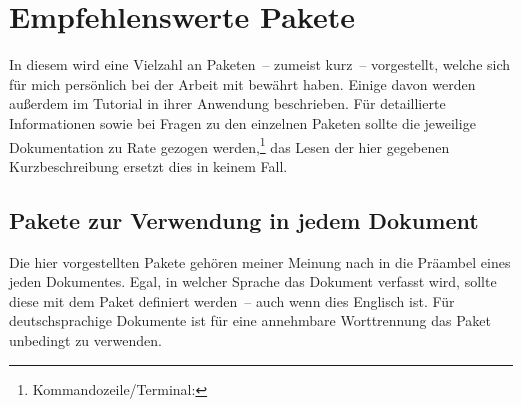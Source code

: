 \newcommand*\RecPack{%
  \hyperref[sec:packages:recommended]{Paketbeschreibung}:\xspace%
}
\section{Empfehlenswerte Pakete}
\label{sec:packages:recommended}
In diesem \autorefname wird eine Vielzahl an Paketen~-- zumeist kurz~-- 
vorgestellt, welche sich für mich persönlich bei der Arbeit mit  
bewährt haben. Einige davon werden außerdem im Tutorial  in 
ihrer Anwendung beschrieben. Für detaillierte Informationen sowie bei Fragen zu 
den einzelnen Paketen sollte die jeweilige Dokumentation zu Rate gezogen
werden,\footnote{Kommandozeile/Terminal: }
das Lesen der hier gegebenen Kurzbeschreibung ersetzt dies in keinem Fall. 


\subsection{Pakete zur Verwendung in jedem Dokument}
Die hier vorgestellten Pakete gehören meiner Meinung nach in die Präambel eines 
jeden Dokumentes. Egal, in welcher Sprache das Dokument verfasst wird, sollte 
diese mit dem Paket  definiert werden~-- auch wenn dies 
Englisch ist. Für deutschsprachige Dokumente ist für eine annehmbare 
Worttrennung das Paket  unbedingt zu verwenden.

